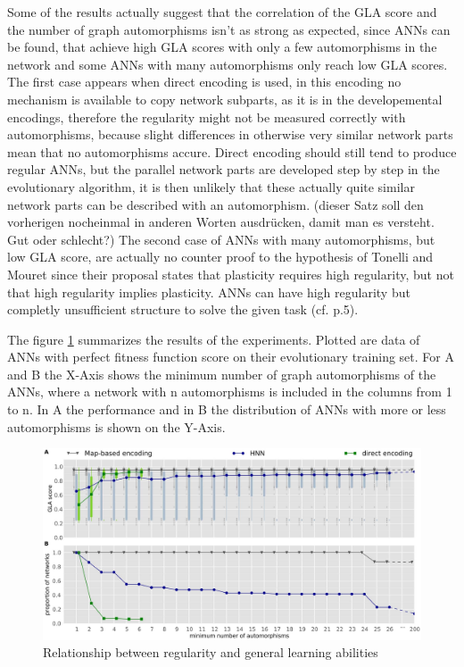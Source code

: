 \documentclass[12pt,twoside]{article}
\theoremstyle{plain}
\theoremstyle{definition}
\theoremstyle{remark}
\begin{document}
Some of the results actually suggest that the correlation of the GLA score and the number of graph automorphisms isn't as strong as expected, since ANNs can be found, that achieve high GLA scores with only a few automorphisms in the network and some ANNs with many automorphisms only reach low GLA scores.
The first case appears when direct encoding is used, in this encoding no mechanism is available to copy network subparts, as it is in the developemental encodings, therefore the regularity might not be measured correctly with automorphisms, because slight differences in otherwise very similar network parts mean that no automorphisms accure. Direct encoding should still tend to produce regular ANNs, but the parallel network parts are developed step by step in the evolutionary algorithm, it is then unlikely that these actually quite similar network parts can be described with an automorphism. (dieser Satz soll den vorherigen nocheinmal in anderen Worten ausdrücken, damit man es versteht. Gut oder schlecht?)
The second case of ANNs with many automorphisms, but low GLA score, are actually no counter proof to the hypothesis of Tonelli and Mouret since their proposal states that plasticity requires high regularity, but not that high regularity implies plasticity. ANNs can have high regularity but completly unsufficient structure to solve the given task (cf. \cite{citeulike:12788284} p.5).\medskip

The figure \ref{fig:results} summarizes the results of the experiments. Plotted are data of ANNs with perfect fitness function score on their evolutionary training set.
For A and B the X-Axis shows the minimum number of graph automorphisms of the ANNs, where a network with n automorphisms is included in the columns from 1 to n. In A the performance and in B the distribution of ANNs with more or less automorphisms is shown on the Y-Axis.

\begin{figure}[h]
	\begin{center}
		\includegraphics[width=1.2\textwidth]{results.png}
	\end{center}
	\caption{Relationship between regularity and general learning abilities}
	\label{fig:results}
\end{figure}
\end{document}
